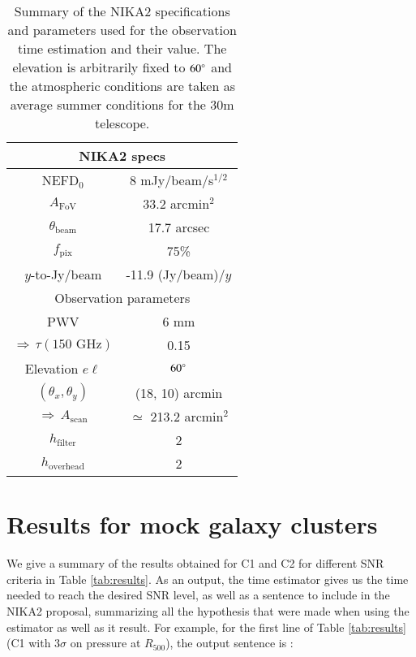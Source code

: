 \documentclass[11pt]{article}
\newcommand{\fh}{_{500}}
\begin{document}
\begin{table}[ht]
    \centering
    \begin{tabular}{c c}
        \toprule
        \multicolumn{2}{c}{NIKA2 specs} \\ 
        \midrule
        NEFD$_0$  &  8 mJy/beam/s$^{1/2}$ \\
        $A_\mathrm{FoV}$  &  33.2 arcmin$^2$ \\
        $\theta_\mathrm{beam}$  &  17.7 arcsec \\
        $f_\mathrm{pix}$  &  75\% \\
        $y$-to-Jy/beam  &  -11.9 (Jy/beam)/$y$ \\
        \midrule
        \multicolumn{2}{c}{Observation parameters} \\ 
        \midrule
        PWV  &  6 mm \\
        $\Rightarrow\,\tau(\text{150 GHz})$  &  0.15 \\
        Elevation $e\ell$  &  $60\degree$ \\
        $(\theta_x, \theta_y)$  &  (18, 10) arcmin \\
        $\Rightarrow\,A_\mathrm{scan}$  &  $\simeq$ 213.2 arcmin$^2$ \\
        $h_\mathrm{filter}$  &  2 \\
        $h_\mathrm{overhead}$  &  2 \\
        \bottomrule
    \end{tabular}
    \caption{Summary of the NIKA2 specifications and parameters used for the observation time estimation and their value. The elevation is arbitrarily fixed to $60\degree$ and the atmospheric conditions are taken as average summer conditions for the 30m telescope.}
    \label{tab:params}
\end{table}

\newpage
\section{Results for mock galaxy clusters}

We give a summary of the results obtained for C1 and C2 for different SNR criteria in Table \ref{tab:results}.
As an output, the time estimator gives us the time needed to reach the desired SNR level, as well as a sentence to include in the NIKA2 proposal, summarizing all the hypothesis that were made when using the estimator as well as it result.
For example, for the first line of Table \ref{tab:results} (C1 with $3\sigma$ on pressure at $R\fh$), the output sentence is :
\end{document}
